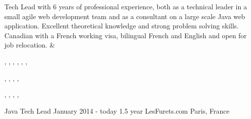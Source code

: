 \documentclass[a4paper]{article}
\begin{document}
%



\begin{cvsummary}%
   Tech Lead with 6 years of professional experience, both as a
  technical leader in a small agile web development team and as a consultant on
  a large scale Java web application. Excellent theoretical knowledge and
  strong problem solving skills. Canadian with a French working visa, bilingual
  French and English and open for job relocation.
&
  \begin{cvsummarytech}%
    ,
    ,
    ,
    ,
    ,
    ,
  \end{cvsummarytech}
  \vspace{1em}
  \begin{cvsummarytech}%
    ,
    ,
    ,
    ,
  \end{cvsummarytech}
  \vspace{1em}
  \begin{cvsummarytech}%
    ,
    ,
    ,
    ,
  \end{cvsummarytech}
\end{cvsummary}




\cvexperiencetitle
  {Java Tech Lead}
  {January 2014 - today}
  {1.5 year}
  {LesFurets.com}
  {Paris, France}
\end{document}
